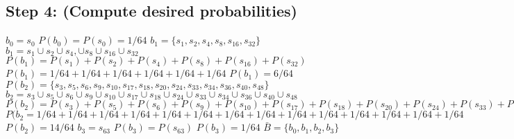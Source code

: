 \documentclass[a4paper,10pt]{article}
\begin{document}
\subsection{Step 4: (Compute desired probabilities)}
$ b_{0} = s_{0} $ \newline
$ P(b_{0}) = P(s_{0}) = 1/64 $ \newline
$ b_{1} = \{s_{1}, s_{2}, s_{4}, s_{8}, s_{16}, s_{32}\} $ \newline
$ b_{1} = s_{1} \cup s_{2} \cup s_{4}, \cup s_{8} \cup s_{16} \cup s_{32} $
$ P(b_{1}) = P(s_{1}) + P(s_{2}) + P(s_{4}) + P(s_{8}) + P(s_{16}) + P(s_{32}) $
$ P(b_{1}) = 1/64 + 1/64 + 1/64 + 1/64 + 1/64 + 1/64 $
$ P(b_{1}) = 6/64 $
$ P(b_{2}) = \{s_{3}, s_{5}, s_{6}, s_{9}, s_{10}, s_{17}, s_{18}, s_{20}, s_{24}, s_{33}, s_{34}, s_{36}, s_{40}, 
s_{48}\} $ \newline
$ b_{2} = s_{3} \cup s_{5} \cup s_{6} \cup s_{9} \cup s_{10} \cup s_{17} \cup s_{18} \cup s_{24} \cup s_{33} \cup 
s_{34} \cup s_{36} \cup s_{40} \cup s_{48} $ \newline
$ P(b_{2}) = P(s_{3}) + P(s_{5}) + P(s_{6}) + P(s_{9}) + P(s_{10}) + P(s_{17}) + P(s_{18}) + P(s_{20}) + P(s_{24}) + 
P(s_{33}) + P(s_{34}) + P(s_{36}) + P(s_{40}) + P(s_{48}) $ \newline
$ P(b_{2} = 1/64 + 1/64 + 1/64 + 1/64 + 1/64 + 1/64 + 1/64 + 1/64 + 1/64 + 1/64 + 1/64 + 1/64 + 1/64 + 1/64 $ 
\newline
$ P(b_{2}) = 14/64 $ \newline
$ b_{3} = s_{63} $ \newline
$ P(b_{3}) = P(s_{63}) $ \newline
$ P(b_{3}) = 1/64 $ \newline
$ \bar{B} = \{b_{0}, b_{1}, b_{2}, b_{3}\} $ \newline  
\end{document}

